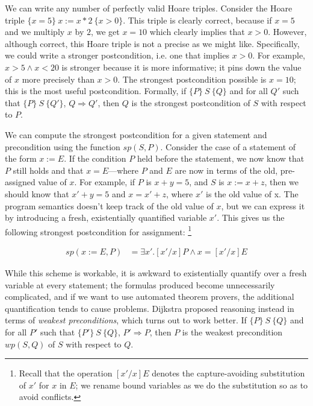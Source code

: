 \documentclass[11pt]{article}
\begin{document}
We can write any number of perfectly valid Hoare triples.  Consider the Hoare
triple $\{x = 5\} ~x := x * 2~ \{ x > 0 \}$.  This triple is clearly correct,
because if $x=5$ and we multiply $x$ by $2$, we get $x=10$ which clearly implies
that $x>0$.  However, although correct, this Hoare triple is not a precise as we
might like.  Specifically, we could write a stronger postcondition, i.e. one
that implies $x>0$.  For example, $x>5 \land x < 20$ is stronger because it is
more informative; it pins down the value of $x$ more precisely than $x>0$.  The
strongest postcondition possible is $x=10$; this is the most useful
postcondition.  Formally, if $\{P\} ~S~ \{Q\}$ and for all $Q'$ such that
$\{P\} ~S~ \{Q'\}$, $Q \Rightarrow Q'$, then $Q$ is the strongest
postcondition of $S$ with respect to $P$.

We can compute the strongest postcondition for a given statement and
precondition using the function $sp(S, P)$.  Consider the case of a statement of
the form $x := E$.  If the condition $P$ held before the statement, we now know
that $P$ still holds and that $x=E$---where $P$ and $E$ are now in terms of the
old, pre-assigned value of $x$.  For example, if $P$ is $x + y = 5$, and $S$ is
$x := x + z$, then we should know that $x' + y = 5$ and $x = x' + z$, where $x'$
is the old value of x.  The program semantics doesn't keep track of the old
value of $x$, but we can express it by introducing a fresh, existentially
quantified variable $x'$.  This gives us the following strongest postcondition
for assignment:%
\footnote{Recall that the operation $[x'/x]E$ denotes the capture-avoiding substitution of
$x'$ for $x$ in $E$; we rename bound variables as we do the substitution so as to
avoid conflicts.}

\[
\begin{array}{ll}
sp(x := E, P) & = \exists x' . [x'/x]P \land x = [x'/x]E
\end{array}
\]


While this scheme is workable, it is awkward to existentially quantify over a
fresh variable at every statement; the formulas produced become unnecessarily
complicated, and if we want to use automated theorem provers, the additional
quantification tends to cause problems.  Dijkstra proposed reasoning instead in
terms of \textit{weakest preconditions}, which turns out to work better.
If $\{P\} ~S~ \{Q\}$ and for all $P'$ such that $\{P'\} ~S~ \{Q\}$, $P'
\Rightarrow P$, then $P$ is the weakest precondition $wp(S,Q)$ of $S$ with
respect to $Q$.
\end{document}
